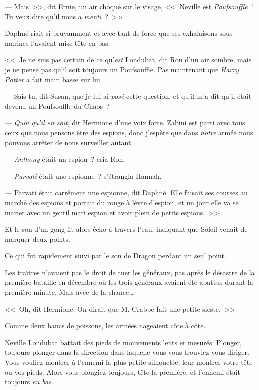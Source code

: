 --- Mais~>>, dit Ernie, un air choqué sur le visage, <<~Neville est \emph{Poufsouffle}~! Tu veux dire qu'il nous a \emph{menti}~?~>>

Daphné riait si bruyamment et avec tant de force que ses exhalaisons sous-marines l'avaient mise tête en bas.

<<~Je ne suis pas certain de ce qu'\emph{est} Londubat, dit Ron d'un air sombre, mais je ne pense pas qu'il soit toujours un Poufsouffle. Pas maintenant que \emph{Harry Potter} a fait main basse sur lui.

--- Sais-tu, dit Susan, que je lui ai \emph{posé} cette question, et qu'il m'a dit qu'il était devenu un Poufsouffle du Chaos~?

--- \emph{Quoi qu'il en soit}, dit Hermione d'une voix forte. Zabini est parti avec tous ceux que nous pensons être des espions, donc j'espère que dans \emph{notre} armée nous pouvons arrêter de nous surveiller autant.

--- \emph{Anthony} était un espion~? cria Ron.

--- \emph{Parvati} était une espionne~? s'étrangla Hannah.

--- Parvati était carrément une espionne, dit Daphné. Elle faisait ses courses au marché des espions et portait du rouge à lèvre d'espion, et un jour elle va se marier avec un gentil mari espion et avoir plein de petits espions.~>>

Et le son d'un gong fit alors écho à travers l'eau, indiquant que Soleil venait de marquer deux points.

Ce qui fut rapidement suivi par le son de Dragon perdant un seul point.

Les traîtres n'avaient pas le droit de tuer les généraux, pas après le désastre de la première bataille en décembre où les trois généraux avaient été abattus durant la première minute. Mais avec de la chance…

<<~Oh, dit Hermione. On dirait que M. Crabbe fait une petite sieste.~>>

\later

Comme deux bancs de poissons, les armées nageaient côte à côte.

Neville Londubat battait des pieds de mouvements lents et mesurés. Plonger, toujours plonger dans la direction dans laquelle vous vous trouviez vous diriger. Vous vouliez montrer à l'ennemi la plus petite silhouette, leur montrer votre tête ou vos pieds. Alors vous plongiez toujours, tête la première, et l'ennemi était toujours \emph{en bas}.

